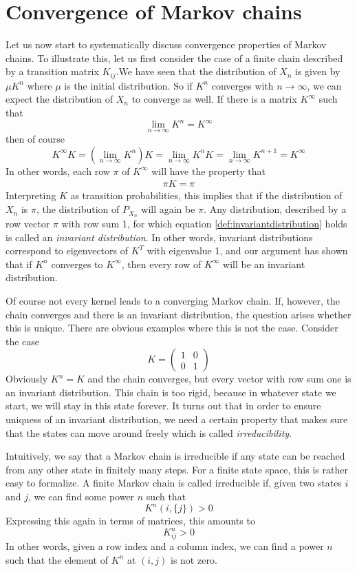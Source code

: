 \documentclass[a4paper, draft]{article}
\theoremstyle{own}
\theoremstyle{remark}
\begin{document}
\section{Convergence of Markov chains}

Let us now start to systematically discuss convergence properties of Markov chains. To illustrate this, let us first consider the case of a finite chain described by a transition matrix $K_{ij}$.We have seen that the distribution of $X_n$ is given by $\mu K^n$ where $\mu$ is the initial distribution. So if $K^n$ converges with $n \rightarrow \infty$, we can expect the distribution of $X_n$ to converge as well. If there is a matrix $K^\infty$ such that
$$
\lim_{n \rightarrow \infty} K^n = K^\infty
$$
then of course 
$$
K^\infty K = ( \lim_{n \rightarrow \infty} K^n) K = \lim_{n \rightarrow \infty} K^n K  = \lim_{n \rightarrow \infty} K^{n+1} = K^\infty
$$
In other words, each row $\pi$ of $K^\infty$ will have the property that
\begin{align}\label{def:invariantdistribution}
\pi K = \pi
\end{align}
Interpreting $K$ as transition probabilities, this implies that if the distribution of $X_n$ is $\pi$, the distribution of $P_{X_n}$ will again be $\pi$. Any distribution, described by a row vector $\pi$ with row sum 1, for which equation \ref{def:invariantdistribution} holds is called an {\em invariant distribution}. In other words, invariant distributions correspond to eigenvectors of $K^T$ with eigenvalue 1, and our argument has shown that if $K^n$ converges to $K^\infty$, then every row of $K^\infty$ will be an invariant distribution.

Of course not every kernel leads to a converging Markov chain. If, however, the chain converges and there is an invariant distribution, the question arises whether this is unique. There are obvious examples where this is not the case. Consider the case 
$$
K = \begin{pmatrix} 1 & 0 \\ 0 & 1 \end{pmatrix}
$$
Obviously $K^n = K$ and the chain converges, but every vector with row sum one is an invariant distribution. This chain is too rigid, because in whatever state we start, we will stay in this state forever. It turns out that in order to ensure uniquess of an invariant distribution, we need a certain property that makes sure that the states can move around freely which is called {\em irreducibility}.

Intuitively, we say that a Markov chain is irreducible if any state can be reached from any other state in finitely many steps. For a finite state space, this is rather easy to formalize. A finite Markov chain is called irreducible if, given two states $i$ and $j$, we can find some power $n$ such that
$$
K^n(i, \{ j\}) > 0
$$
Expressing this again in terms of matrices, this amounts to
$$
K^n_{ij} > 0
$$
In other words, given a row index and a column index, we can find a power $n$ such that the element of $K^n$ at $(i,j)$ is not zero. 
\end{document}
